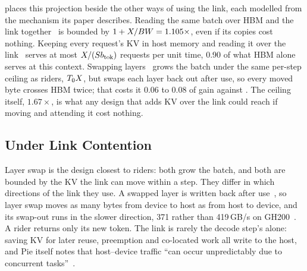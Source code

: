 

 places this projection beside the other ways of using the
link, each modelled from the mechanism its paper describes. Reading the same
batch over HBM and the link together~\cite{dak} is bounded by
$1+X/BW = 1.105\times$, even if its copies cost nothing. Keeping every
request's KV in host memory and reading it over the link~\cite{directkv}
serves at most $X/(Sb_{\mathrm{tok}})$ requests per unit time, 0.90 of what HBM alone
serves at this context. Swapping layers~\cite{pie} grows the batch under the
same per-step ceiling as riders, $T_0X$, but swaps each layer back out
after use, so every moved byte crosses HBM twice; that costs it 0.06 to 0.08
of gain against \sysname{}. The ceiling itself, $1.67\times$, is what any design
that adds KV over the link could reach if moving and attending it cost nothing.

\subsection{Under Link Contention}\label{sec:eval-pie}



Layer swap is the design closest to riders: both grow the batch, and both are
bounded by the KV the link can move within a step. They differ in which
directions of the link they use. A swapped layer is written back after
use~\cite{pie}, so layer swap moves as many bytes from device to host as from
host to device, and its swap-out runs in the slower direction, 371 rather
than 419\,GB/s on GH200~\cite{pie}. A rider returns only its new token. The
link is rarely the decode step's alone: saving KV for later reuse,
preemption and co-located work all write to the host, and Pie itself notes
that host--device traffic ``can occur unpredictably due to concurrent
tasks''~\cite{pie}.

